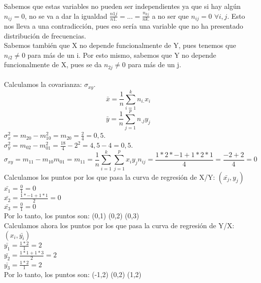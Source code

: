     Sabemos que estas variables no pueden ser independientes ya que si hay algún $n_{ij}=0$, no se va a dar la igualdad $\frac{n1j}{n1.} = ... = \frac{n_{kj}}{nk.}$ a no ser que $n_{ij}=0$ $\forall i,j$. Esto nos lleva a una contradicción, pues eso sería una variable que no ha presentado distribución de frecuencias. \\
    Sabemos también que X no depende funcionalmente de Y, pues tenemos que $n_{i2} \not = 0$ para más de un i. Por esto mismo, sabemos que Y no depende funcionalmente de X, pues se da $n_{2j} \neq 0$ para más de un j. \\ \\
    Calculamos la covarianza: $\sigma_{xy}$.\\
    \[\bar{x}=\frac{1}{n}\sum_{i=1}^{k}n_{i.}x_i\] 
    \[\bar{y}=\frac{1}{n}\sum_{j=1}^{p}n_{.j}y_j\]
    $\sigma_x^2 = m_{20}-m_{10}^2 = m_{20} = \frac{2}{4} = 0,5$. \\
    $\sigma_y^2 = m_{02}-m_{01}^2 = \frac{18}{4} -2^2=4,5 - 4 = 0,5$. \\
    \[\sigma_{xy} = m_{11} - m_{10}m_{01} = m_{11} = \frac{1}{n} \sum_{i=1}^{k}\sum_{j=1}^{p} x_iy_jn_{ij} = \frac{1*2*-1 + 1*2*1}{4} = \frac{-2+2}{4} = 0 \]
    Calculamos los puntos por los que pasa la curva de regresión de X/Y: $(\bar{x_j},y_j)$ \\
    $\bar{x_1} = \frac{0}{1} = 0$ \\
    $ \bar{x_2} = \frac{1*-1 + 1*1}{2} = 0$ \\
    $\bar{x_3} = \frac{0}{1} = 0$ \\
    Por lo tanto, los puntos son: (0,1)    (0,2)    (0,3) \\
    Calculamos ahora los puntos por los que pasa la curva de regresión de Y/X: $(x_i,\bar{y_i})$ \\
    $\bar{y_1} = \frac{1*2}{1} = 2$ \\
    $\bar{y_2} = \frac{1*1+1*3}{2} = 2$ \\
    $\bar{y_3} = \frac{1*2}{1} = 2$ \\
    Por lo tanto, los puntos son: (-1,2)    (0,2)    (1,2)
    